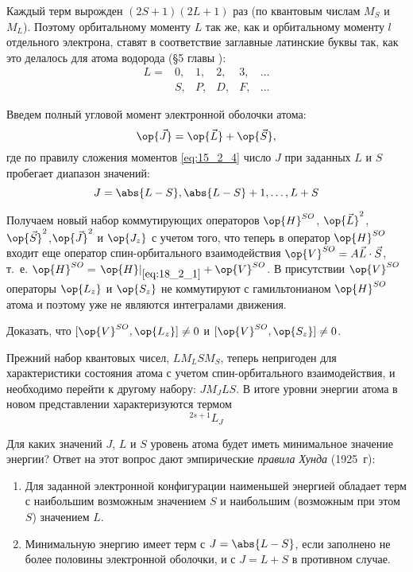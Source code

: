 Каждый терм вырожден $(2S+1)(2L+1)$ раз (по квантовым числам $M_S$ и $M_L$). Поэтому орбитальному моменту $L$ так же, как и орбитальному моменту $l$ отдельного электрона, ставят в соответствие заглавные латинские буквы так, как это делалось для атома водорода (\S 5 главы ):
$$ 
\begin{matrix}
L= & 0, & 1, & 2,& 3, & \dots \\
      & S, & P, & D, & F, & \dots 
\end{matrix}
$$

Введем полный угловой момент электронной оболочки атома:
\begin{equation}
\label{eq:18_3_1}
\op{\vec{J}} = \op{\vec{L}} + \op{\vec{S}},
\end{equation}
где по правилу сложения моментов \eqref{eq:15_2_4} число $J$ при заданных $L$ и $S$ пробегает диапазон значений:
$$
J = \abs{L-S}, \abs{L-S} + 1, \dots, L+S
$$

Получаем новый набор коммутирующих операторов $\op{H}^{SO}$, $\op{\vec{L}}^2$, $\op{\vec{S}}^2$,$\op{\vec{J}}^2$ и $\op{J_z}$ с учетом того, что теперь в оператор $\op{H}^{SO}$ входит еще оператор спин-орбитального взаимодействия $\op{V}^{SO} = A \vec{L} \cdot \vec{S}$, т.~е. $\op{H}^{SO} = \left .\op{H} \right |_{\eqref{eq:18_2_1}} + \op{V}^{SO}$. В присутствии $\op{V}^{SO}$ операторы $\op{L_z}$ и $\op{S_z}$ не коммутируют с гамильтонианом $\op{H}^{SO}$ атома и поэтому уже не являются интегралами движения.

\begin{excr}
Доказать, что $[\op{V}^{SO}, \op{L_z}] \neq 0$ и $[\op{V}^{SO}, \op{S_z}] \neq 0$.
\end{excr}

Прежний набор квантовых чисел, $L M_L S M_S$, теперь непригоден для характеристики состояния атома с учетом спин-орбитального взаимодействия, и необходимо перейти к другому набору: $J M_J L S$. В итоге уровни энергии атома в новом представлении характеризуются термом 
$$
\boxed{^{2s+1}L_J}
$$


Для каких значений $J$, $L$ и $S$ уровень атома будет иметь минимальное значение энергии? Ответ на этот вопрос дают эмпирические {\em правила Хунда}\footnotemark{} (1925~г):
%
\begin{enumerate}
\item Для заданной электронной конфигурации наименьшей энергией обладает терм с наибольшим возможным значением $S$ и наибольшим (возможным при этом $S$) значением $L$.
\item Минимальную энергию имеет терм с $J = \abs{L-S}$, если заполнено не более половины электронной оболочки, и с $J = L + S$ в противном случае.
\end{enumerate}

